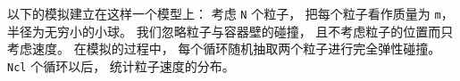 
以下的模拟建立在这样一个模型上： 考虑 \verb`N` 个粒子， 把每个粒子看作质量为 \verb`m`， 半径为无穷小的小球。 我们忽略粒子与容器壁的碰撞， 且不考虑粒子的位置而只考虑速度。 在模拟的过程中， 每个循环随机抽取两个粒子进行完全弹性碰撞。 \verb`Ncl` 个循环以后， 统计粒子速度的分布。
